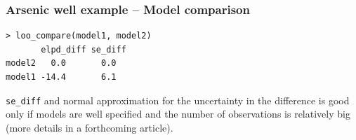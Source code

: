 \documentclass[10pt]{beamer}
\begin{document}




\begin{frame}[fragile]

\frametitle{Arsenic well example -- Model comparison}

  {\scriptsize
\begin{lstlisting}
> loo_compare(model1, model2)
       elpd_diff se_diff
model2   0.0       0.0
model1 -14.4       6.1
\end{lstlisting}}

    {\tt se\_diff} and normal approximation for the uncertainty in the
    difference is good only if models are well specified and the
    number of observations is relatively big (more details in a
    forthcoming article).


\end{frame}
\end{document}
